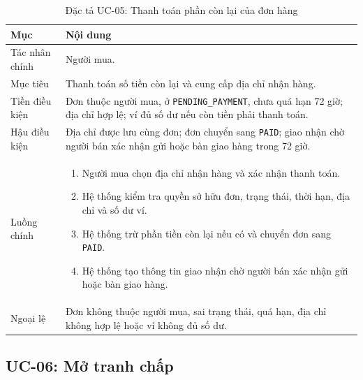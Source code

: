 \documentclass[../DoAn.tex]{subfiles}
\begin{document}
\begin{table}[H]
    \centering
    \caption{Đặc tả UC-05: Thanh toán phần còn lại của đơn hàng}
    \label{tab:uc-pay-order-remainder}
    \footnotesize
    \setlength{\tabcolsep}{4pt}
    \renewcommand{\arraystretch}{1.03}
    \begin{tabular}{|>{\raggedright\arraybackslash}p{}|>{\raggedright\arraybackslash}p{}|}
        \hline
        \textbf{Mục} & \textbf{Nội dung} \\
        \hline
        Tác nhân chính & Người mua. \\
        \hline
        Mục tiêu & Thanh toán số tiền còn lại và cung cấp địa chỉ nhận hàng. \\
        \hline
        Tiền điều kiện & Đơn thuộc người mua, ở \texttt{PENDING\_PAYMENT}, chưa quá hạn 72 giờ; địa chỉ hợp lệ; ví đủ số dư nếu còn tiền phải thanh toán. \\
        \hline
        Hậu điều kiện & Địa chỉ được lưu cùng đơn; đơn chuyển sang \texttt{PAID}; giao nhận chờ người bán xác nhận gửi hoặc bàn giao hàng trong 72 giờ. \\
        \hline
        Luồng chính &
        \begin{enumerate}[label=\roman*., leftmargin=*, nosep]
            \item Người mua chọn địa chỉ nhận hàng và xác nhận thanh toán.
            \item Hệ thống kiểm tra quyền sở hữu đơn, trạng thái, thời hạn, địa chỉ và số dư ví.
            \item Hệ thống trừ phần tiền còn lại nếu có và chuyển đơn sang \texttt{PAID}.
            \item Hệ thống tạo thông tin giao nhận chờ người bán xác nhận gửi hoặc bàn giao hàng.
        \end{enumerate} \\
        \hline
        Ngoại lệ & Đơn không thuộc người mua, sai trạng thái, quá hạn, địa chỉ không hợp lệ hoặc ví không đủ số dư. \\
        \hline
    \end{tabular}
\end{table}
\FloatBarrier

\subsection{UC-06: Mở tranh chấp}
\end{document}
